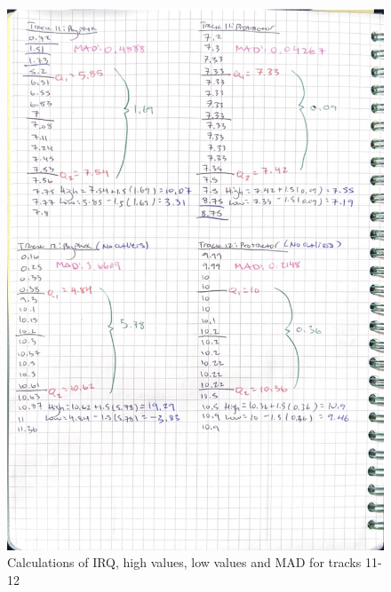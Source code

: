 \documentclass[idxtotoc,hyperref,openany]{labbook} %
\begin{document}
\begin{figure}[H] %
\begin{center}
\includegraphics[width=0.9\linewidth]{images/PhyProTrack11-12.png}
\end{center}
\caption{Calculations of IRQ, high values, low values and MAD for tracks 11-12}
\label{fig:Track11-12PhyphoxProtractor}
\end{figure}
\end{document}
